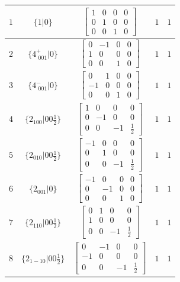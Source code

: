 \documentclass[fleqn,8pt]{jsarticle}
\begin{document}
\begin{longtable}{ccccc}
$ 1 $ & $ \{1|0\} $ & $ \begin{bmatrix} 1 & 0 & 0 & 0 \\ 0 & 1 & 0 & 0 \\ 0 & 0 & 1 & 0 \end{bmatrix} $ & $ 1 $ & $ 1 $ \\ \hline
$ 2 $ & $ \{4^{+}_{\,\,001}|0\} $ & $ \begin{bmatrix} 0 & -1 & 0 & 0 \\ 1 & 0 & 0 & 0 \\ 0 & 0 & 1 & 0 \end{bmatrix} $ & $ 1 $ & $ 1 $ \\ \hline
$ 3 $ & $ \{4^{-}_{\,\,001}|0\} $ & $ \begin{bmatrix} 0 & 1 & 0 & 0 \\ -1 & 0 & 0 & 0 \\ 0 & 0 & 1 & 0 \end{bmatrix} $ & $ 1 $ & $ 1 $ \\ \hline
$ 4 $ & $ \{2{}_{100}|0 0 \frac{1}{2}\} $ & $ \begin{bmatrix} 1 & 0 & 0 & 0 \\ 0 & -1 & 0 & 0 \\ 0 & 0 & -1 & \frac{1}{2} \end{bmatrix} $ & $ 1 $ & $ 1 $ \\ \hline
$ 5 $ & $ \{2{}_{010}|0 0 \frac{1}{2}\} $ & $ \begin{bmatrix} -1 & 0 & 0 & 0 \\ 0 & 1 & 0 & 0 \\ 0 & 0 & -1 & \frac{1}{2} \end{bmatrix} $ & $ 1 $ & $ 1 $ \\ \hline
$ 6 $ & $ \{2{}_{001}|0\} $ & $ \begin{bmatrix} -1 & 0 & 0 & 0 \\ 0 & -1 & 0 & 0 \\ 0 & 0 & 1 & 0 \end{bmatrix} $ & $ 1 $ & $ 1 $ \\ \hline
$ 7 $ & $ \{2{}_{110}|0 0 \frac{1}{2}\} $ & $ \begin{bmatrix} 0 & 1 & 0 & 0 \\ 1 & 0 & 0 & 0 \\ 0 & 0 & -1 & \frac{1}{2} \end{bmatrix} $ & $ 1 $ & $ 1 $ \\ \hline
$ 8 $ & $ \{2{}_{1-10}|0 0 \frac{1}{2}\} $ & $ \begin{bmatrix} 0 & -1 & 0 & 0 \\ -1 & 0 & 0 & 0 \\ 0 & 0 & -1 & \frac{1}{2} \end{bmatrix} $ & $ 1 $ & $ 1 $ \\ \hline

\end{longtable}
\end{document}
